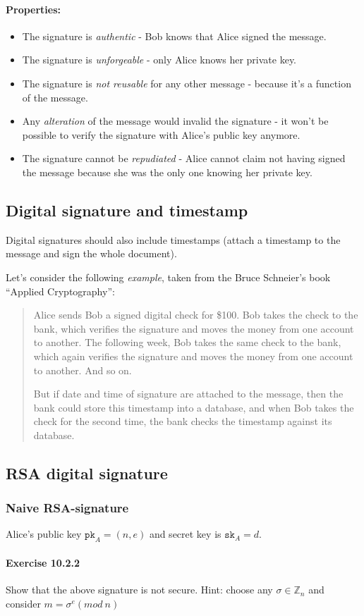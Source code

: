 \documentclass{article}
\begin{document}
	\paragraph{Properties:}

	\begin{itemize}
		\item The signature is \emph{authentic} - Bob knows that Alice signed the
			message.
		\item The signature is \emph{unforgeable} - only Alice knows her private
			key.
		\item The signature is \emph{not reusable} for any other message -
			because it's a function of the message.
		\item Any \emph{alteration} of the message would invalid the signature -
			it won't be possible to verify the signature with Alice's public key anymore.
		\item The signature cannot be \emph{repudiated} - Alice cannot claim not
			having signed the message because she was the only one knowing her
			private key.
	\end{itemize}

	\subsection{Digital signature and timestamp}

	Digital signatures should also include timestamps (attach a timestamp to the
	message and sign the whole document). 

	Let's consider the following \emph{example}, taken from the Bruce Schneier's book
	“Applied Cryptography”:
	\begin{quotation}
		Alice sends Bob a signed digital check for \$100. Bob takes the check to
		the bank, which verifies the signature and moves the money from one
		account to another.
		The following week, Bob takes the same check to the bank, which again
		verifies the signature and moves the money from one account to another.
		And so on.

		But if date and time of signature are attached to the message, then the bank
		could store this timestamp into a database, and when Bob takes the check for
		the second time, the bank checks the timestamp against its database.
	\end{quotation}

	\subsection{RSA digital signature}

	\subsubsection{Naive RSA-signature}

	Alice's public key $\texttt{pk}_{A} = (n, e)$ and secret key is
	$\texttt{sk}_{A} = d$.

	\paragraph{Exercise 10.2.2} 

	Show that the above signature is not secure.
	Hint: choose any 
	$\sigma \in \mathbb{Z}_{n}$ and consider $m = \sigma^{e} (mod ~ n)$
	
	
\end{document}
